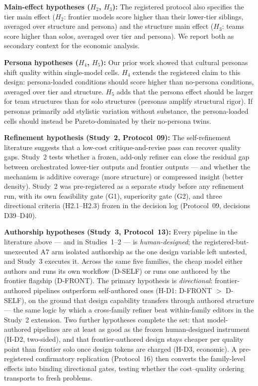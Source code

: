 \documentclass[12pt,a4paper]{article}
\begin{document}
\medskip
\noindent\textbf{Main-effect hypotheses ($H_2$, $H_3$):} The registered
protocol also specifies the tier main effect ($H_2$: frontier models score
higher than their lower-tier siblings, averaged over structure and persona)
and the structure main effect ($H_3$: teams score higher than solos, averaged
over tier and persona). We report both as secondary context for the economic
analysis.

\medskip
\noindent\textbf{Persona hypotheses ($H_4$, $H_5$):} Our prior work
\citep{Hariri2026b} showed that cultural personas shift quality within
single-model cells. $H_4$ extends the registered claim to this design:
persona-loaded conditions should score higher than no-persona conditions,
averaged over tier and structure. $H_5$ adds that the persona effect should be
larger for team structures than for solo structures (personas amplify
structural rigor). If personas primarily add stylistic variation without
substance, the persona-loaded cells should instead be Pareto-dominated by
their no-persona twins.

\medskip
\noindent\textbf{Refinement hypothesis (Study~2, Protocol~09):} The
self-refinement literature \citep{ShinnEtAl2023} suggests that a low-cost
critique-and-revise pass can recover quality gaps. Study~2 tests whether a
frozen, add-only refiner can close the residual gap between orchestrated
lower-tier outputs and frontier outputs --- and whether the mechanism is
additive coverage (more structure) or compressed insight (better density).
Study~2 was pre-registered as a separate study before any refinement run,
with its own feasibility gate (G1), superiority gate (G2), and three
directional criteria (H2.1--H2.3) frozen in the decision log (Protocol~09,
decisions D39--D40).

\medskip
\noindent\textbf{Authorship hypotheses (Study~3, Protocol~13):} Every pipeline
in the literature above --- and in Studies~1--2 --- is \emph{human-designed};
the registered-but-unexecuted A7 arm isolated authorship as the one design
variable left untested, and Study~3 executes it. Across the same five families,
the cheap model either authors and runs its own workflow (D-SELF) or runs one
authored by the frontier flagship (D-FRONT). The primary hypothesis is
\emph{directional}: frontier-authored pipelines outperform self-authored ones
(H-D1: D-FRONT $>$ D-SELF), on the ground that design capability transfers
through authored structure --- the same logic by which a cross-family refiner
beat within-family editors in the Study~2 extension. Two further hypotheses complete the set:
that model-authored pipelines are at least as good as the frozen human-designed
instrument (H-D2, two-sided), and that frontier-authored design stays cheaper
per quality point than frontier solo once design tokens are charged (H-D3,
economic). A pre-registered confirmatory replication (Protocol~16) then converts
the family-level effects into binding directional gates, testing whether the
cost--quality ordering transports to fresh problems.
\end{document}
